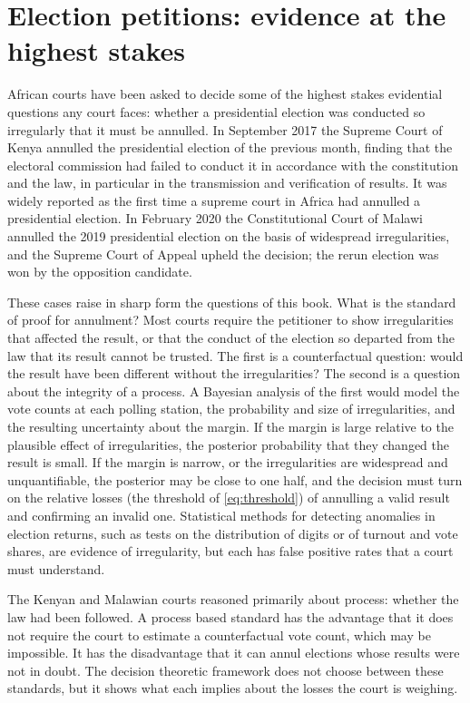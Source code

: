 \section{Election petitions: evidence at the highest stakes}

African courts have been asked to decide some of the highest stakes evidential questions any court faces: whether a presidential election was conducted so irregularly that it must be annulled. In September 2017 the Supreme Court of Kenya annulled the presidential election of the previous month, finding that the electoral commission had failed to conduct it in accordance with the constitution and the law, in particular in the transmission and verification of results. It was widely reported as the first time a supreme court in Africa had annulled a presidential election. In February 2020 the Constitutional Court of Malawi annulled the 2019 presidential election on the basis of widespread irregularities, and the Supreme Court of Appeal upheld the decision; the rerun election was won by the opposition candidate.

These cases raise in sharp form the questions of this book. What is the standard of proof for annulment? Most courts require the petitioner to show irregularities that affected the result, or that the conduct of the election so departed from the law that its result cannot be trusted. The first is a counterfactual question: would the result have been different without the irregularities? The second is a question about the integrity of a process. A Bayesian analysis of the first would model the vote counts at each polling station, the probability and size of irregularities, and the resulting uncertainty about the margin. If the margin is large relative to the plausible effect of irregularities, the posterior probability that they changed the result is small. If the margin is narrow, or the irregularities are widespread and unquantifiable, the posterior may be close to one half, and the decision must turn on the relative losses (the threshold of \eqref{eq:threshold}) of annulling a valid result and confirming an invalid one. Statistical methods for detecting anomalies in election returns, such as tests on the distribution of digits or of turnout and vote shares, are evidence of irregularity, but each has false positive rates that a court must understand.

The Kenyan and Malawian courts reasoned primarily about process: whether the law had been followed. A process based standard has the advantage that it does not require the court to estimate a counterfactual vote count, which may be impossible. It has the disadvantage that it can annul elections whose results were not in doubt. The decision theoretic framework does not choose between these standards, but it shows what each implies about the losses the court is weighing.

